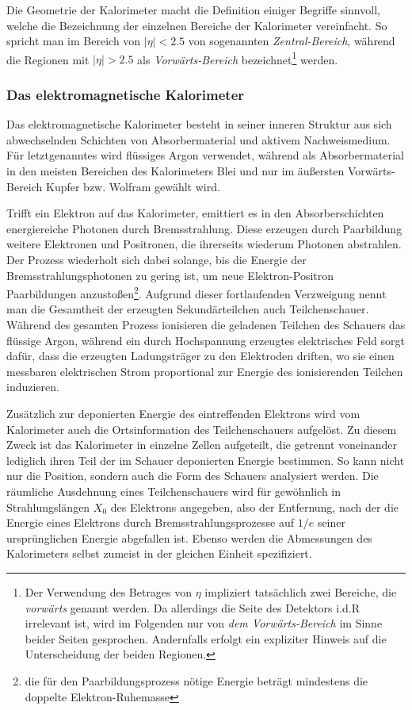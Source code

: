 Die Geometrie der Kalorimeter macht die Definition einiger Begriffe sinnvoll,
welche die Bezeichnung der einzelnen Bereiche der Kalorimeter vereinfacht. So
spricht man im Bereich von $|\eta|<2.5$ von sogenannten \emph{Zentral-Bereich},
während die Regionen mit $|\eta| > 2.5$ als \emph{Vorwärts-Bereich}
bezeichnet\footnote{Der Verwendung des Betrages von $\eta$ impliziert
tatsächlich zwei Bereiche, die \textit{vorwärts} genannt werden. Da allerdings
die Seite des Detektors i.d.R irrelevant ist, wird im Folgenden nur von 
\textit{dem Vorwärts-Bereich} im Sinne beider Seiten gesprochen. Andernfalls
erfolgt ein expliziter Hinweis auf die Unterscheidung der beiden Regionen.}
werden.

\subsubsection{Das elektromagnetische Kalorimeter}
Das elektromagnetische Kalorimeter besteht in seiner inneren Struktur aus sich
abwechselnden Schichten von Absorbermaterial und aktivem Nachweismedium. Für
letztgenanntes wird flüssiges Argon verwendet, während als Absorbermaterial in
den meisten Bereichen des Kalorimeters Blei und nur im äußersten
Vorwärts-Bereich Kupfer bzw. Wolfram gewählt wird.

Trifft ein Elektron auf das Kalorimeter, emittiert es in den Absorberschichten
energiereiche Photonen durch Bremsstrahlung. Diese erzeugen durch Paarbildung
weitere Elektronen und Positronen, die ihrerseits wiederum Photonen abstrahlen.
Der Prozess wiederholt sich dabei solange, bis die Energie der
Bremsstrahlungsphotonen zu gering ist, um neue Elektron-Positron Paarbildungen
anzustoßen\footnote{die für den Paarbildungsprozess nötige Energie beträgt
mindestens die doppelte Elektron-Ruhemasse}. Aufgrund dieser fortlaufenden
Verzweigung nennt man die Gesamtheit der erzeugten Sekundärteilchen auch
Teilchenschauer. Während des gesamten Prozess ionisieren die geladenen Teilchen
des Schauers das flüssige Argon, während ein durch Hochspannung erzeugtes
elektrisches Feld sorgt dafür, dass die erzeugten Ladungsträger zu den
Elektroden driften, wo sie einen messbaren elektrischen Strom proportional zur
Energie des ionisierenden Teilchen induzieren.

Zusätzlich zur deponierten Energie des eintreffenden Elektrons wird vom
Kalorimeter auch die Ortsinformation des Teilchenschauers aufgelöst. Zu diesem
Zweck ist das Kalorimeter in einzelne Zellen aufgeteilt, die getrennt
voneinander lediglich ihren Teil der im Schauer deponierten Energie bestimmen.
So kann nicht nur die Position, sondern auch die Form des Schauers analysiert
werden. Die räumliche Ausdehnung eines Teilchenschauers wird für gewöhnlich in
Strahlungslängen $X_0$ des Elektrons angegeben, also der Entfernung, nach der
die Energie eines Elektrons durch Bremsstrahlungsprozesse auf $1/e$ seiner
ursprünglichen Energie abgefallen ist. Ebenso werden die Abmessungen des
Kalorimeters selbst zumeist in der gleichen Einheit spezifiziert.


